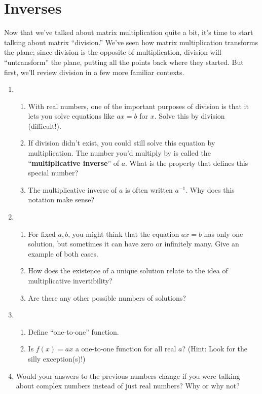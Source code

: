 \documentclass[../gatm.tex]{subfiles}
\begin{document}
\section{Inverses}
\setcounter{problem_i}{0}

\noindent Now that we've talked about matrix multiplication quite a bit, it's time to start talking about matrix ``division.'' We've seen how matrix multiplication transforms the plane; since division is the opposite of multiplication, division will ``untransform'' the plane, putting all the points back where they started. But first, we'll review division in a few more familiar contexts.

\begin{enumerate}
\setcounter{enumi}{\value{problem_i}}
\item \begin{enumerate}
\item With real numbers, one of the important purposes of division is that it lets you solve equations like $ax=b$ for $x$. Solve this by division (difficult!).
\item If division didn't exist, you could still solve this equation by multiplication. The number you'd multiply by is called the ``\textbf{multiplicative inverse}'' of $a$. What is the property that defines this special number?
\item The multiplicative inverse of $a$ is often written $a^{-1}$. Why does this notation make sense?
\end{enumerate}
\item \begin{enumerate}
\item For fixed $a,b$, you might think that the equation $ax=b$ has only one solution, but sometimes it can have zero or infinitely many. Give an example of both cases.
\item How does the existence of a unique solution relate to the idea of multiplicative invertibility?
\item Are there any other possible numbers of solutions?
\end{enumerate}
\item \begin{enumerate}
\item Define ``one-to-one'' function.
\item Is $f(x)=ax$ a one-to-one function for all real $a$? (Hint: Look for the silly exception(s)!)
\end{enumerate}
\item Would your answers to the previous numbers change if you were talking about complex numbers instead of just real numbers? Why or why not?
\setcounter{problem_i}{\value{enumi}}
\end{enumerate}
\end{document}
